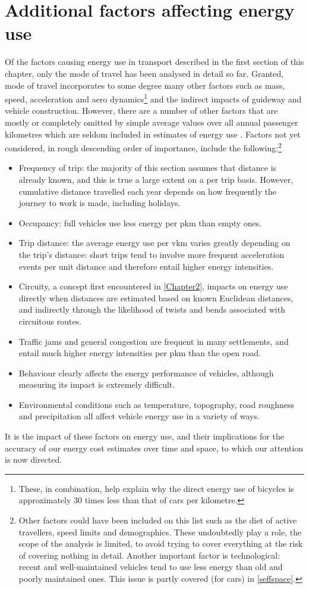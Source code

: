 \documentclass[a4paper, 11pt, twoside]{Thesis}
\begin{document}
\section{Additional factors affecting energy use} \label{svariable}
Of the factors causing energy use in transport described in the first
section of this chapter, only the mode of travel has been analysed in
detail so far. Granted, mode of travel incorporates to some degree many
other factors such as mass, speed, acceleration and aero
dynamics\footnote{These,
in combination, help explain why the direct energy use of bicycles is
approximately 30 times less than that of cars per kilometre.} and the indirect
impacts of guideway and vehicle construction. However, there are a number of other
factors that are mostly or completely omitted by simple average values over
all annual passenger kilometres which are seldom included in estimates of
energy use \citep{Schipper1993}. Factors not yet considered, in rough
descending order of importance, include the following:\footnote{Other factors
could have been included on this list such as the diet of active travellers,
speed limits and demographics. These undoubtedly play a role, the scope of the
analysis is limited, to avoid trying to cover everything at
the risk of covering nothing in detail. Another important factor is
technological: recent and well-maintained vehicles tend to use less energy
than old and poorly maintained ones. This issue is partly covered (for cars)
in \cref{seffspace}.
}
\begin{itemize}
 \item Frequency of trip: the majority of this section assumes that distance
 is already known, and this is true a large extent on a per trip basis.
 However, cumulative distance travelled each year depends on how frequently
 the journey to work is made, including holidays. 
 \item Occupancy: full vehicles use less energy per pkm than empty ones.
 \item Trip distance: the average energy use per vkm varies greatly depending
 on the trip's distance: short trips tend to involve more frequent acceleration
 events per unit distance and therefore entail higher energy intensities.
 \item Circuity, a concept first encountered in \cref{Chapter2}, impacts on energy
 use directly when distances are estimated based on known Euclidean distances, and
 indirectly through the likelihood of twists and bends associated with circuitous
 routes.
 \item Traffic jams and general congestion are frequent in many settlements, and
 entail much higher energy intensities per pkm than the open road.
 \item Behaviour clearly affects the energy performance of vehicles, although
 measuring its impact is extremely difficult.
 \item Environmental conditions such as temperature, topography, road roughness
 and precipitation all affect vehicle energy use in a variety of ways.
\end{itemize}
It is the impact of these factors on energy use, and their implications
for the accuracy of our energy cost estimates over time and space, to which
our attention is now directed.
\end{document}

